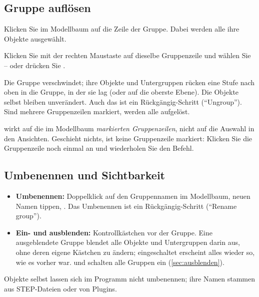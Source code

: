 \subsection{Gruppe auflösen}

\begin{schritte}
  \item Klicken Sie im Modellbaum auf die Zeile der Gruppe. Dabei werden alle ihre Objekte
    ausgewählt.
  \item Klicken Sie mit der rechten Maustaste auf dieselbe Gruppenzeile und wählen Sie
     -- oder drücken Sie .
\end{schritte}

Die Gruppe verschwindet; ihre Objekte und Untergruppen rücken eine Stufe nach oben in die
Gruppe, in der sie lag (oder auf die oberste Ebene). Die Objekte selbst bleiben unverändert.
Auch das ist ein Rückgängig-Schritt (\enquote{Ungroup}). Sind mehrere Gruppenzeilen markiert,
werden alle aufgelöst.

\begin{hinweis}
 wirkt auf die im Modellbaum \emph{markierten Gruppenzeilen}, nicht auf die
Auswahl in den Ansichten. Geschieht nichts, ist keine Gruppenzeile markiert: Klicken Sie die
Gruppenzeile noch einmal an und wiederholen Sie den Befehl.
\end{hinweis}

\subsection{Umbenennen und Sichtbarkeit}

\begin{itemize}
  \item \textbf{Umbenennen:} Doppelklick auf den Gruppennamen im Modellbaum, neuen Namen
    tippen, . Das Umbenennen ist ein Rückgängig-Schritt (\enquote{Rename group}).
  \item \textbf{Ein- und ausblenden:} Kontrollkästchen vor der Gruppe. Eine ausgeblendete
    Gruppe blendet alle Objekte und Untergruppen darin aus, ohne deren eigene Kästchen zu
    ändern; eingeschaltet erscheint alles wieder so, wie es vorher war.  und
     schalten alle Gruppen ein (\autoref{sec:ausblenden}).
\end{itemize}

Objekte selbst lassen sich im Programm nicht umbenennen; ihre Namen stammen aus STEP-Dateien
oder von Plugins.

